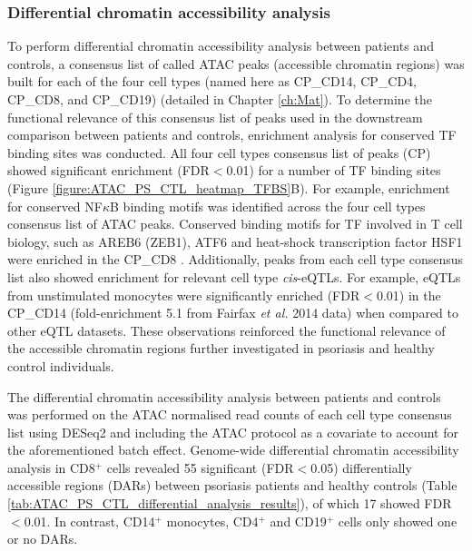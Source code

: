 \subsubsection{Differential chromatin accessibility analysis}

To perform differential chromatin accessibility analysis between patients and controls, a consensus list of called ATAC peaks (accessible chromatin regions) was built for each of the four cell types (named here as CP\_CD14, CP\_CD4, CP\_CD8, and CP\_CD19) (detailed in Chapter \ref{ch:Mat}). To determine the functional relevance of this consensus list of peaks used in the downstream comparison between patients and controls, enrichment analysis for conserved TF binding sites was conducted. All four cell types consensus list of peaks (CP) showed significant enrichment (FDR$<$0.01) for a number of TF binding sites (Figure \ref{figure:ATAC_PS_CTL_heatmap_TFBS}B). For example, enrichment for conserved NF$\kappa$B binding motifs was identified across the four cell types consensus list of ATAC peaks. Conserved binding motifs for TF involved in T cell biology, such as AREB6 (ZEB1), ATF6 and heat-shock transcription factor HSF1 were enriched in the CP\_CD8 \parencite{Guan2018,Yamazaki2009,Gandhapudi2013}. Additionally, peaks from each cell type consensus list also showed enrichment for relevant cell type \textit{cis}-eQTLs. For example, eQTLs from unstimulated monocytes were significantly enriched (FDR$<$0.01) in the CP\_CD14 (fold-enrichment 5.1 from Fairfax \textit{et al.} 2014 data) when compared to other eQTL datasets. These observations reinforced the functional relevance of the accessible chromatin regions further investigated in psoriasis and healthy control individuals.

The differential chromatin accessibility analysis between patients and controls was performed on the ATAC normalised read counts of each cell type consensus list using DESeq2 and including the ATAC protocol as a covariate to account for the aforementioned  batch effect. Genome-wide differential chromatin accessibility analysis in CD8$^+$ cells revealed 55 significant (FDR$<$0.05) differentially accessible regions (DARs) between psoriasis patients and healthy controls (Table \ref{tab:ATAC_PS_CTL_differential_analysis_results}), of which 17 showed FDR$<$0.01. In contrast, CD14$^+$ monocytes, CD4$^+$ and CD19$^+$ cells only showed one or no DARs. 


